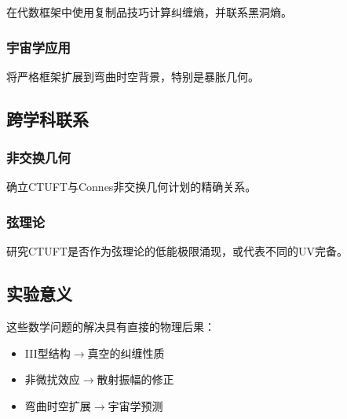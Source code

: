 \begin{problem}
在代数框架中使用复制品技巧计算纠缠熵，并联系黑洞熵。
\end{problem}

\subsubsection{宇宙学应用}

\begin{problem}
将严格框架扩展到弯曲时空背景，特别是暴胀几何。
\end{problem}

\subsection{跨学科联系}

\subsubsection{非交换几何}

\begin{problem}
确立CTUFT与Connes非交换几何计划的精确关系。
\end{problem}

\subsubsection{弦理论}

\begin{problem}
研究CTUFT是否作为弦理论的低能极限涌现，或代表不同的UV完备。
\end{problem}

\subsection{实验意义}

这些数学问题的解决具有直接的物理后果：
\begin{itemize}
    \item III型结构$\to$真空的纠缠性质
    \item 非微扰效应$\to$散射振幅的修正
    \item 弯曲时空扩展$\to$宇宙学预测
\end{itemize}
